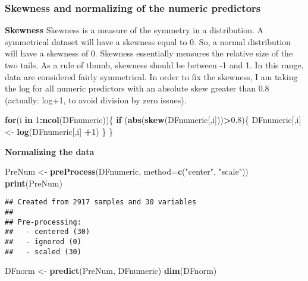 \documentclass[]{article}
\newenvironment{Shaded}{\begin{snugshade}}{\end{snugshade}}
\newcommand{\KeywordTok}[1]{\textcolor[rgb]{0.13,0.29,0.53}{\textbf{#1}}}
\newcommand{\DataTypeTok}[1]{\textcolor[rgb]{0.13,0.29,0.53}{#1}}
\newcommand{\DecValTok}[1]{\textcolor[rgb]{0.00,0.00,0.81}{#1}}
\newcommand{\FloatTok}[1]{\textcolor[rgb]{0.00,0.00,0.81}{#1}}
\newcommand{\StringTok}[1]{\textcolor[rgb]{0.31,0.60,0.02}{#1}}
\newcommand{\ControlFlowTok}[1]{\textcolor[rgb]{0.13,0.29,0.53}{\textbf{#1}}}
\newcommand{\OperatorTok}[1]{\textcolor[rgb]{0.81,0.36,0.00}{\textbf{#1}}}
\newcommand{\NormalTok}[1]{#1}
\begin{document}
\subsubsection{Skewness and normalizing of the numeric
predictors}\label{skewness-and-normalizing-of-the-numeric-predictors}

\textbf{Skewness} Skewness is a measure of the symmetry in a
distribution. A symmetrical dataset will have a skewness equal to 0. So,
a normal distribution will have a skewness of 0. Skewness essentially
measures the relative size of the two tails. As a rule of thumb,
skewness should be between -1 and 1. In this range, data are considered
fairly symmetrical. In order to fix the skewness, I am taking the log
for all numeric predictors with an absolute skew greater than 0.8
(actually: log+1, to avoid division by zero issues).

\begin{Shaded}
\begin{Highlighting}[]
\ControlFlowTok{for}\NormalTok{(i }\ControlFlowTok{in} \DecValTok{1}\OperatorTok{:}\KeywordTok{ncol}\NormalTok{(DFnumeric))\{}
        \ControlFlowTok{if}\NormalTok{ (}\KeywordTok{abs}\NormalTok{(}\KeywordTok{skew}\NormalTok{(DFnumeric[,i]))}\OperatorTok{>}\FloatTok{0.8}\NormalTok{)\{}
\NormalTok{                DFnumeric[,i] <-}\StringTok{ }\KeywordTok{log}\NormalTok{(DFnumeric[,i] }\OperatorTok{+}\DecValTok{1}\NormalTok{)}
\NormalTok{        \}}
\NormalTok{\}}
\end{Highlighting}
\end{Shaded}

\textbf{Normalizing the data}

\begin{Shaded}
\begin{Highlighting}[]
\NormalTok{PreNum <-}\StringTok{ }\KeywordTok{preProcess}\NormalTok{(DFnumeric, }\DataTypeTok{method=}\KeywordTok{c}\NormalTok{(}\StringTok{"center"}\NormalTok{, }\StringTok{"scale"}\NormalTok{))}
\KeywordTok{print}\NormalTok{(PreNum)}
\end{Highlighting}
\end{Shaded}

\begin{verbatim}
## Created from 2917 samples and 30 variables
## 
## Pre-processing:
##   - centered (30)
##   - ignored (0)
##   - scaled (30)
\end{verbatim}

\begin{Shaded}
\begin{Highlighting}[]
\NormalTok{DFnorm <-}\StringTok{ }\KeywordTok{predict}\NormalTok{(PreNum, DFnumeric)}
\KeywordTok{dim}\NormalTok{(DFnorm)}
\end{Highlighting}
\end{Shaded}
\end{document}
